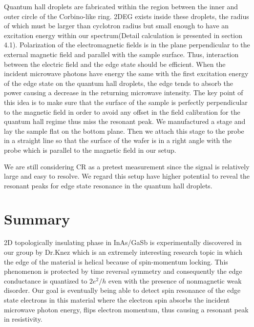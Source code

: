 \documentclass[12pt]{ruthesis}
\begin{document}
Quantum hall droplets are fabricated within the region between the inner and outer circle of the Corbino-like ring. 
2DEG exists inside these droplets, the radius of which must be larger than cyclotron radius but small enough to have an excitation energy within our spectrum(Detail calculation is presented in section 4.1).
Polarization of the electromagnetic fields is in the plane perpendicular to the external magnetic field and parallel with the sample surface. 
Thus, interaction between the electric field and the edge state should be efficient.
When the incident microwave photons have energy the same with the first excitation energy of the edge state on the quantum hall droplets, the edge tends to absorb the power causing a decrease in the returning microwave intensity.
The key point of this idea is to make sure that the surface of the sample is perfectly perpendicular to the magnetic field in order to avoid any offset in the field calibration for the quantum hall regime thus miss the resonant peak.  
We manufactured a stage and lay the sample flat on the bottom plane. 
Then we attach this stage to the probe in a straight line so that the surface of the wafer is in a right angle with the probe which is parallel to the magnetic field in our setup. 

We are still considering CR as a pretest measurement since the signal is relatively large and easy to resolve. 
We regard this setup have higher potential to reveal the resonant peaks for edge state resonance in the quantum hall droplets.    





\chapter{Summary}\label{summary}
2D topologically insulating phase in InAs/GaSb is experimentally discovered in our group by Dr.Knez \cite{IvanThesis} which is an extremely interesting research topic in which the edge of the material is helical because of spin-momentum locking. 
This phenomenon is protected by time reversal symmetry and consequently the edge conductance is quantized to $2e^{2}/h$ even with the presence of nonmagnetic weak disorder. 
Our goal is eventually being able to detect spin resonance of the edge state electrons in this material where the electron spin absorbs the incident microwave photon energy, flips electron momentum, thus causing a resonant peak in resistivity. 
\end{document}

